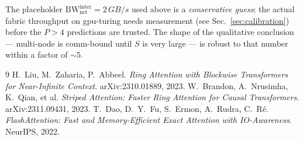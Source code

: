 \documentclass[11pt]{article}
\newcommand{\bw}{\mathrm{BW}}
\begin{document}
The placeholder $\bw_{\text{net}}^{\text{inter}} = 2\,\si{GB/s}$ used
above is a \emph{conservative guess}; the actual fabric throughput on
gpu-turing needs measurement (see Sec.~\ref{sec:calibration})
before the $P > 4$ predictions are trusted. The shape of the
qualitative conclusion --- multi-node is comm-bound until $S$ is
very large --- is robust to that number within a factor of $\sim 5$.

\begin{thebibliography}{9}
    H.~Liu, M.~Zaharia, P.~Abbeel.
    \emph{Ring Attention with Blockwise Transformers for Near-Infinite Context}.
    arXiv:2310.01889, 2023.
    W.~Brandon, A.~Nrusimha, K.~Qian, et al.
    \emph{Striped Attention: Faster Ring Attention for Causal Transformers}.
    arXiv:2311.09431, 2023.
    T.~Dao, D.~Y.~Fu, S.~Ermon, A.~Rudra, C.~R\'e.
    \emph{FlashAttention: Fast and Memory-Efficient Exact Attention with IO-Awareness}.
    NeurIPS, 2022.
\end{thebibliography}
\end{document}
